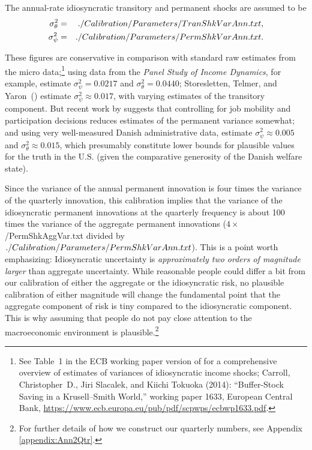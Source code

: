 \documentclass[titlepage]{\econtex}\newcommand{\texname}{cAndCwithStickyE}
\begin{document}
The annual-rate idiosyncratic transitory and permanent shocks are assumed to be
\begin{eqnarray*}
   \sigma_{\theta}^{2} & = &  ./Calibration/Parameters/TranShkVarAnn.txt ,
\\ \sigma_{\psi}^{2}             & = &  ./Calibration/Parameters/PermShkVarAnn.txt
.
\end{eqnarray*}

These figures are conservative in comparison with standard raw estimates from the micro data;\footnote{See Table~1 in the ECB working paper version of \cite{cstKS} for a comprehensive overview of estimates of variances of idiosyncratic income shocks; Carroll, Christopher~D., Jiri Slacalek, and Kiichi Tokuoka (2014): ``Buffer-Stock Saving in a Krusell--Smith World,'' working paper 1633, European Central Bank, \url{https://www.ecb.europa.eu/pub/pdf/scpwps/ecbwp1633.pdf}.} using data from the {\it Panel Study of Income Dynamics}, for example, \cite{carroll&samwick:nature} estimate $\sigma_{\psi}^{2} = 0.0217$ and $\sigma_{\theta}^{2} = 0.0440$; Storesletten, Telmer, and Yaron~(\citeyear{sty:consumption}) estimate $\sigma_{\psi}^{2} \approx 0.017$, with varying estimates of the transitory component.  But recent work by \cite{lmp:wagerisk} suggests that controlling for job mobility and participation decisions reduces estimates of the permanent variance somewhat; and using very well-measured Danish administrative data, \cite{nv:risk} estimate $\sigma_{\psi}^{2} \approx 0.005$ and $\sigma_{\theta}^{2} \approx 0.015$, which presumably constitute lower bounds for plausible values for the truth in the U.S. (given the comparative generosity of the Danish welfare state).

Since the variance of the annual permanent innovation is four times the variance of the quarterly innovation, this calibration implies that the variance of the idiosyncratic permanent innovations at the quarterly frequency is about 100 times the variance of the aggregate permanent innovations ($4 \times $ \ParmDir/PermShkAggVar.txt divided by $ ./Calibration/Parameters/PermShkVarAnn.txt $).  This is a point worth emphasizing: Idiosyncratic uncertainty is {\it approximately two orders of magnitude larger} than aggregate uncertainty.  While reasonable people could differ a bit from our calibration of either the aggregate or the idiosyncratic risk, no plausible calibration of either magnitude will change the fundamental point that the aggregate component of risk is tiny compared to the idiosyncratic component.  This is why assuming that people do not pay close attention to the macroeconomic environment is plausible.\footnote{For further details of how we construct our quarterly numbers, see Appendix \ref{appendix:Ann2Qtr}.}
\end{document}
